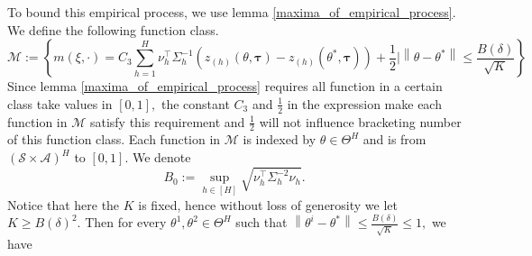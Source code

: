 \documentclass{article}
\numberwithin{equation}{section}
\theoremstyle{plain}
\theoremstyle{definition}
\theoremstyle{remark}
\begin{document}
To bound this empirical process, we use lemma \ref{maxima_of_empirical_process}. We define the following function class.
\begin{equation}\label{definition_M}
    \mathcal{M} := \left\{m(\xi,\cdot) = C_3 \sum_{h=1}^H \nu_h^{\top} \Sigma_h^{-1} \left(z_{(h)}\left(\theta, \boldsymbol{\tau}\right) - z_{(h)}\left(\theta^*, \boldsymbol{\tau}\right)\right) + \frac{1}{2}\bigg| \left\|\theta - \theta^*\right\| \leq \frac{B(\delta)}{\sqrt{K}}\right\}
\end{equation}
Since lemma \ref{maxima_of_empirical_process} requires all function in a certain class take values in $[0,1],$ the constant $C_3$ and $\frac{1}{2}$ in the expression make each function in $\mathcal{M}$ satisfy this requirement and $\frac{1}{2}$ will not influence bracketing number of this function class. Each function in $\mathcal{M}$ is indexed by $\theta \in \Theta^H$ and is from $\left(\mathcal{S}\times \mathcal{A}\right)^H$ to $[0,1].$ We denote 
\begin{equation}\label{definition_B_0}
    B_0 := \sup_{h \in [H]} \sqrt{\nu_h^{\top}\Sigma_h^{-2}\nu_h}.
\end{equation}
Notice that here the $K$ is fixed, hence without loss of generosity we let $K \geq B(\delta)^2.$ Then for every $\theta^1,\theta^2 \in \Theta^H$ such that $\left\|\theta^i - \theta^*\right\| \leq  \frac{B(\delta)}{\sqrt{K}} \leq 1,$ we have
\end{document}
